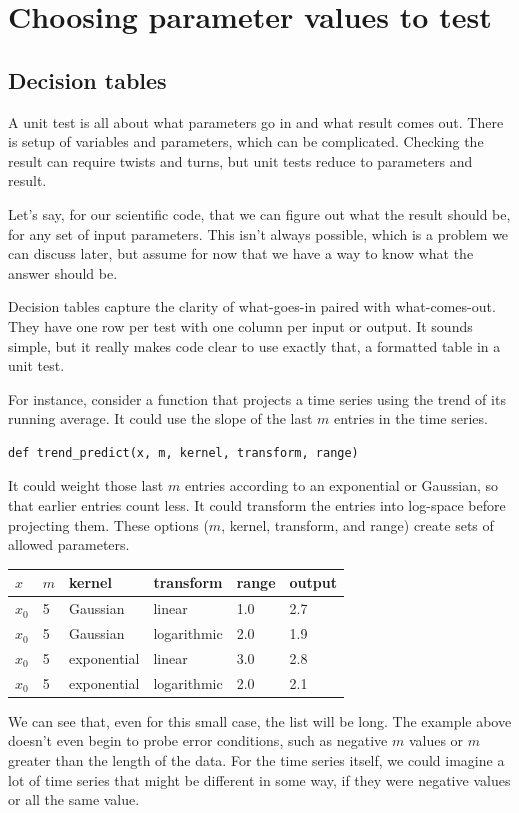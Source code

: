 \documentclass[fleqn,10pt]{olplainarticle}
\begin{document}
\section{Choosing parameter values to test}\label{sec:parameter-logic}

\subsection{Decision tables}\label{sec:parameter-decision}

A unit test is all about what parameters go in and what result
comes out. There is setup of variables and
parameters, which can be complicated. Checking the result can
require twists and turns, but unit tests reduce to parameters and
result.

Let's say, for our scientific code, that we can figure out what the result
should be, for any set of input parameters. This isn't always
possible, which is a problem we can discuss later, but assume
for now that we have a way to know what the answer should be.

Decision tables capture the clarity of what-goes-in paired
with what-comes-out. They have one row per test with one
column per input or output. It sounds simple, but it
really makes code clear to use exactly that, a formatted
table in a unit test.

For instance, consider a function that projects a time series
using the trend of its running average. It could use the slope
of the last $m$ entries in the time series.
\begin{lstlisting}
def trend_predict(x, m, kernel, transform, range)
\end{lstlisting}
It could weight
those last $m$ entries according to an exponential or Gaussian, so that
earlier entries count less. It could transform the entries
into log-space before projecting them. These options
($m$, kernel, transform, and range) create
sets of allowed parameters.
\begin{center}
\begin{tabular}{|l|l|l|l|l|l|}\hline
$x$ & $m$ & kernel & transform & range & output \\ \hline
$x_0$ & 5 & Gaussian & linear & 1.0 & 2.7 \\
$x_0$ & 5 & Gaussian & logarithmic & 2.0 & 1.9 \\
$x_0$ & 5 & exponential & linear & 3.0 & 2.8 \\
$x_0$ & 5 & exponential & logarithmic & 2.0 & 2.1 \\ \hline
\end{tabular}
\end{center}
We can see that, even for
this small case, the list will be long. The example
above doesn't even begin to probe error conditions, such
as negative $m$ values or $m$ greater than the length
of the data. For the time series itself, we could imagine
a lot of time series that might be different in some way,
if they were negative values or all the same value.
\end{document}
